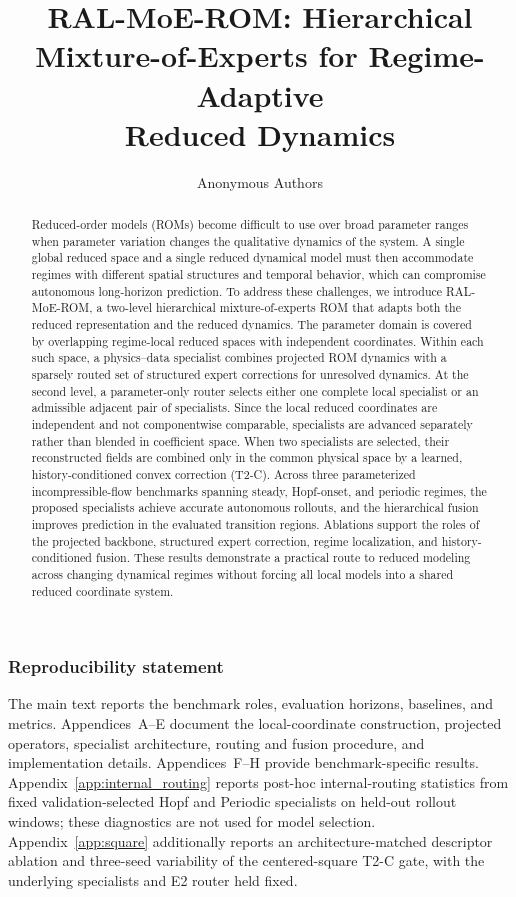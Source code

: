 \documentclass{article}
\title{RAL-MoE-ROM: Hierarchical\\
Mixture-of-Experts for Regime-Adaptive\\
Reduced Dynamics}
\author{Anonymous Authors}
\begin{document}
\maketitle

\begin{abstract}
Reduced-order models (ROMs) become difficult to use over broad parameter ranges when parameter variation changes the qualitative dynamics of the system. A single global reduced space and a single reduced dynamical model must then accommodate regimes with different spatial structures and temporal behavior, which can compromise autonomous long-horizon prediction. To address these challenges, we introduce RAL-MoE-ROM, a two-level hierarchical mixture-of-experts ROM that adapts both the reduced representation and the reduced dynamics. The parameter domain is covered by overlapping regime-local reduced spaces with independent coordinates. Within each such space, a physics--data specialist combines projected ROM dynamics with a sparsely routed set of structured expert corrections for unresolved dynamics. At the second level, a parameter-only router selects either one complete local specialist or an admissible adjacent pair of specialists. Since the local reduced coordinates are independent and not componentwise comparable, specialists are advanced
separately rather than blended in coefficient space. When two specialists are selected, their reconstructed fields are combined only in the common physical space by a learned, history-conditioned convex correction (T2-C). Across three parameterized incompressible-flow benchmarks spanning steady, Hopf-onset, and periodic regimes, the proposed specialists achieve accurate autonomous rollouts, and the hierarchical fusion improves prediction in the evaluated transition regions. Ablations support the roles of the projected
backbone, structured expert correction, regime localization, and
history-conditioned fusion. These results demonstrate a practical route to reduced modeling across changing dynamical regimes without forcing all
local models into a shared reduced coordinate system.
\end{abstract}





\FloatBarrier


\subsubsection*{Reproducibility statement}
The main text reports the benchmark roles, evaluation horizons, baselines, and metrics. Appendices~A--E document the local-coordinate construction, projected operators, specialist architecture, routing and fusion procedure, and implementation details. Appendices~F--H provide benchmark-specific results.
Appendix~\ref{app:internal_routing} reports post-hoc internal-routing statistics
from fixed validation-selected Hopf and Periodic specialists on held-out
rollout windows; these diagnostics are not used for model selection.
Appendix~\ref{app:square} additionally reports an architecture-matched descriptor
ablation and three-seed variability of the centered-square T2-C gate, with the
underlying specialists and E2 router held fixed.
\end{document}
